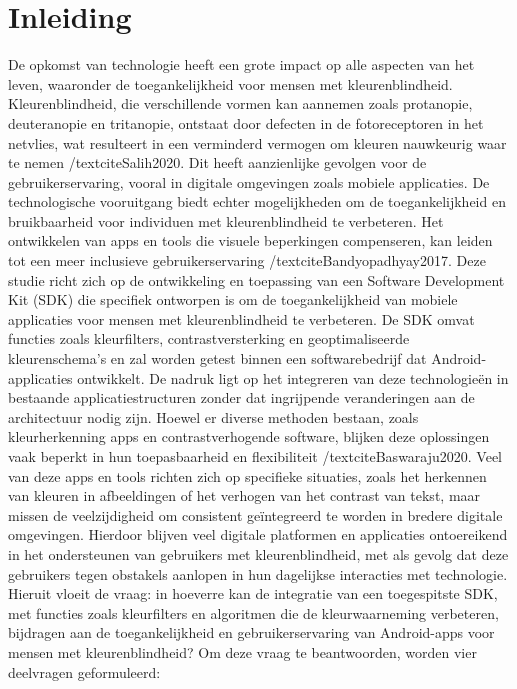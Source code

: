 \section{Inleiding}%
\label{sec:inleiding}
De opkomst van technologie heeft een grote impact op alle aspecten van het leven, waaronder de 
toegankelijkheid voor mensen met kleurenblindheid. Kleurenblindheid, die verschillende vormen kan 
aannemen zoals protanopie, deuteranopie en tritanopie, ontstaat door defecten in de fotoreceptoren 
in het netvlies, wat resulteert in een verminderd vermogen om kleuren nauwkeurig waar te nemen 
/textcite{Salih2020}. Dit heeft aanzienlijke gevolgen voor de gebruikerservaring, vooral in digitale 
omgevingen zoals mobiele applicaties. De technologische vooruitgang biedt echter mogelijkheden om de 
toegankelijkheid en bruikbaarheid voor individuen met kleurenblindheid te verbeteren. Het ontwikkelen 
van apps en tools die visuele beperkingen compenseren, kan leiden tot een meer inclusieve 
gebruikerservaring /textcite{Bandyopadhyay2017}. Deze studie richt zich op de ontwikkeling en toepassing van een Software 
Development Kit (SDK) die specifiek ontworpen is om de toegankelijkheid van mobiele applicaties 
voor mensen met kleurenblindheid te verbeteren. De SDK omvat functies zoals kleurfilters, 
contrastversterking en geoptimaliseerde kleurenschema’s en zal worden getest binnen een 
softwarebedrijf dat Android-applicaties ontwikkelt. De nadruk ligt op het integreren van deze 
technologieën in bestaande applicatiestructuren zonder dat ingrijpende veranderingen aan de 
architectuur nodig zijn. Hoewel er diverse methoden bestaan, zoals kleurherkenning apps en 
contrastverhogende software, blijken deze oplossingen vaak beperkt in hun toepasbaarheid en 
flexibiliteit /textcite{Baswaraju2020}. Veel van deze apps en tools richten zich op specifieke situaties, zoals het herkennen 
van kleuren in afbeeldingen of het verhogen van het contrast van tekst, maar missen de veelzijdigheid 
om consistent geïntegreerd te worden in bredere digitale omgevingen. Hierdoor blijven veel digitale 
platformen en applicaties ontoereikend in het ondersteunen van gebruikers met kleurenblindheid, met 
als gevolg dat deze gebruikers tegen obstakels aanlopen in hun dagelijkse interacties met 
technologie. Hieruit vloeit de vraag: in hoeverre kan de integratie van een toegespitste SDK, met 
functies zoals kleurfilters en algoritmen die de kleurwaarneming verbeteren, bijdragen aan de 
toegankelijkheid en gebruikerservaring van Android-apps voor mensen met kleurenblindheid?
Om deze vraag te beantwoorden, worden vier deelvragen geformuleerd:

